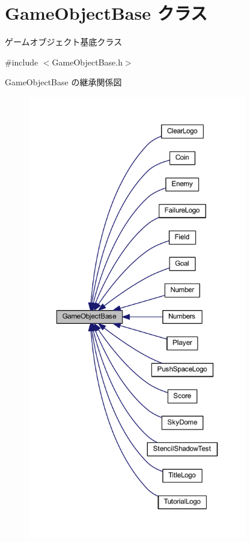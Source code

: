\hypertarget{class_game_object_base}{}\section{Game\+Object\+Base クラス}
\label{class_game_object_base}


ゲームオブジェクト基底クラス  




{\ttfamily \#include $<$Game\+Object\+Base.\+h$>$}



Game\+Object\+Base の継承関係図\nopagebreak
\begin{figure}[H]
\begin{center}
\leavevmode
\includegraphics[height=550pt]{class_game_object_base__inherit__graph}
\end{center}
\end{figure}

